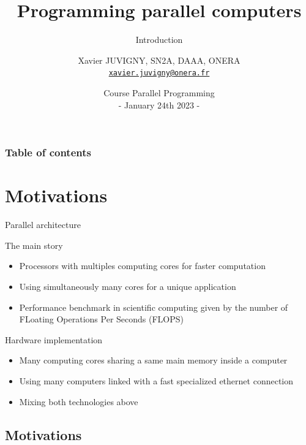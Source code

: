 \documentclass[compress,10pt,aspectratio=169]{beamer}
\title[Parallel programming\hspace{2em}]{Programming parallel computers}
\subtitle{Introduction}
\author[X. JUVIGNY]{Xavier JUVIGNY, SN2A, DAAA, ONERA\\ \href{mailto:xavier.juvigny@onera.fr}{\texttt{xavier.juvigny@onera.fr}} }
\date[01/24/2023]{Course Parallel Programming\\- January 24th 2023 -}
\institute{\inst{1}ONERA,\inst{2}DAAA}
\begin{document}
\MakeTitlePage

\begin{frame}
\frametitle{Table of contents}
\tableofcontents[hideallsubsections]
\end{frame}

\section{Motivations}

\begin{frame}[fragile]{Parallel architecture}
    \small
    \begin{block}{The main story}
        \begin{itemize}
            \item Processors with multiples computing cores for faster computation
            \item Using simultaneously many cores for a unique application
            \item Performance benchmark in scientific computing given by the number of FLoating Operations Per Seconds (FLOPS)
        \end{itemize}
    \end{block}

    \begin{exampleblock}{Hardware implementation}
        \begin{itemize}
            \item Many computing cores sharing a same main memory inside a computer
            \item Using many computers linked with a fast specialized ethernet connection
            \item Mixing both technologies above
        \end{itemize}
    \end{exampleblock}
\end{frame}

\subsection{Motivations}
\end{document}
